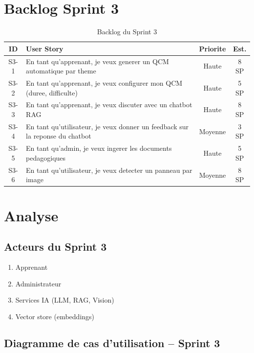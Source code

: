 \documentclass[a4paper,12pt]{report}
\begin{document}
\section{Backlog Sprint 3}

\begin{table}[H]
  \centering
  \caption{Backlog du Sprint 3}
  \label{tab:backlog_s3}
  \begin{tabular}{|c|p{7.5cm}|c|c|}
    \hline
    \textbf{ID} & \textbf{User Story} & \textbf{Priorite} & \textbf{Est.} \\
    \hline
    S3-1 & En tant qu'apprenant, je veux generer un QCM automatique par theme & Haute & 8 SP \\
    \hline
    S3-2 & En tant qu'apprenant, je veux configurer mon QCM (duree, difficulte) & Haute & 5 SP \\
    \hline
    S3-3 & En tant qu'apprenant, je veux discuter avec un chatbot RAG & Haute & 8 SP \\
    \hline
    S3-4 & En tant qu'utilisateur, je veux donner un feedback sur la reponse du chatbot & Moyenne & 3 SP \\
    \hline
    S3-5 & En tant qu'admin, je veux ingerer les documents pedagogiques & Haute & 5 SP \\
    \hline
    S3-6 & En tant qu'utilisateur, je veux detecter un panneau par image & Moyenne & 8 SP \\
    \hline
  \end{tabular}
\end{table}

\section{Analyse}

\subsection{Acteurs du Sprint 3}
\begin{enumerate}
  \item Apprenant
  \item Administrateur
  \item Services IA (LLM, RAG, Vision)
  \item Vector store (embeddings)
\end{enumerate}

\subsection{Diagramme de cas d'utilisation -- Sprint 3}
\end{document}
